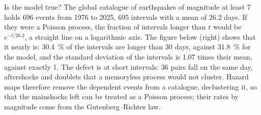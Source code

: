 Is the model true? The global catalogue of earthquakes of magnitude at least 7 holds 696 events
from 1976 to 2025, 695 intervals with a mean of 26.2 days. If they were a Poisson process,
the fraction of intervals longer than $t$ would be $e^{-t/26.2}$, a straight line on a logarithmic
axis. The figure below (right) shows that it nearly is: \qty{30.4}{\percent} of the intervals are
longer than 30 days, against \qty{31.8}{\percent} for the model, and the standard deviation of the
intervals is 1.07 times their mean, against exactly 1. The defect is at short intervals: 36 pairs
fall on the same day, aftershocks and doublets that a memoryless process would not cluster. Hazard
maps therefore remove the dependent events from a catalogue, declustering it, so that the
mainshocks left can be treated as a Poisson process; their rates by magnitude come from the
Gutenberg--Richter law.

